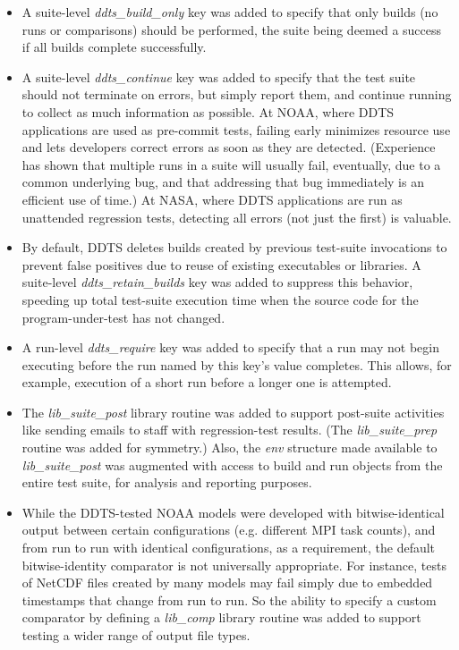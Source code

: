 \documentclass[conference]{IEEEtran}
\begin{document}
\begin{itemize}
\item A suite-level \emph{ddts\_build\_only} key was added to specify that only builds (no runs or comparisons) should be performed, the suite being deemed a success if all builds complete successfully.
\item A suite-level \emph{ddts\_continue} key was added to specify that the test suite should not terminate on errors, but simply report them, and continue running to collect as much information as possible. At NOAA, where DDTS applications are used as pre-commit tests, failing early minimizes resource use and lets developers correct errors as soon as they are detected. (Experience has shown that multiple runs in a suite will usually fail, eventually, due to a common underlying bug, and that addressing that bug immediately is an efficient use of time.) At NASA, where DDTS applications are run as unattended regression tests, detecting all errors (not just the first) is valuable.
\item By default, DDTS deletes builds created by previous test-suite invocations to prevent false positives due to reuse of existing executables or libraries. A suite-level \emph{ddts\_retain\_builds} key was added to suppress this behavior, speeding up total test-suite execution time when the source code for the program-under-test has not changed.
\item A run-level \emph{ddts\_require} key was added to specify that a run may not begin executing before the run named by this key's value completes. This allows, for example, execution of a short run before a longer one is attempted.
\item The \emph{lib\_suite\_post} library routine was added to support post-suite activities like sending emails to staff with regression-test results. (The \emph{lib\_suite\_prep} routine was added for symmetry.) Also, the \emph{env} structure made available to \emph{lib\_suite\_post} was augmented with access to build and run objects from the entire test suite, for analysis and reporting purposes.
\item While the DDTS-tested NOAA models were developed with bitwise-identical output between certain configurations (e.g. different MPI task counts), and from run to run with identical configurations, as a requirement, the default bitwise-identity comparator is not universally appropriate. For instance, tests of NetCDF files created by many models may fail simply due to embedded timestamps that change from run to run. So the ability to specify a custom comparator by defining a \emph{lib\_comp} library routine was added to support testing a wider range of output file types.

\end{itemize}
\end{document}
